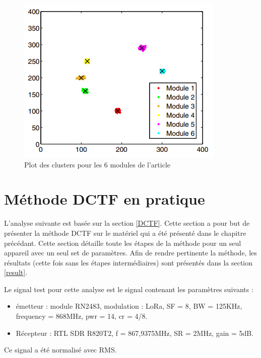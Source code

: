 \begin{figure}[h]
\centering

\includegraphics[scale=0.8]{images/impossible.png}
\caption{Plot des clusters pour les 6 modules de l'article\cite{loraDCTF}}\label{term4000}
\end{figure}

 
\section{Méthode DCTF en pratique}

L'analyse suivante est basée sur la section \ref{DCTF}. Cette section a pour but de présenter la méthode DCTF sur le matériel qui a été présenté dans le chapitre précédant. Cette section détaille toute les étapes de la méthode pour un seul appareil avec un seul set de paramètres. Afin de rendre pertinente la méthode, les résultats (cette fois sans les étapes intermédiaires) sont présentés dans la section \ref{result}.

Le signal test pour cette analyse est le signal contenant les paramètres suivants :

\vspace{0.1cm}

\begin{itemize}
\item émetteur : module RN2483, modulation : LoRa, SF = 8, BW = 125KHz, frequency = 868MHz, pwr = 14, cr = 4/8.
\item Récepteur : RTL SDR R820T2, f = 867,9375MHz, SR = 2MHz, gain = 5dB.
\end{itemize}

\vspace{0.1cm}

Ce signal a été normalisé avec RMS.

